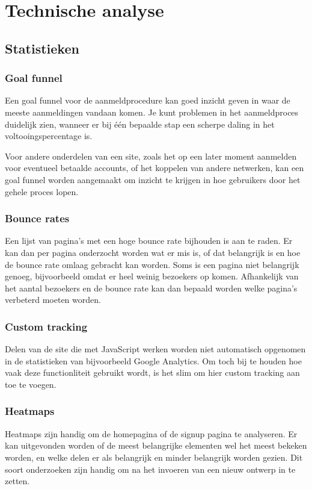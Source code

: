 \documentclass[a4paper, 10pt, pdftex]{report}
\begin{document}
  \section{Technische analyse}
    \subsection{Statistieken}
      \subsubsection{Goal funnel}
        Een goal funnel voor de aanmeldprocedure kan goed inzicht geven in waar de meeste aanmeldingen vandaan komen. Je kunt problemen in het aanmeldproces duidelijk zien, wanneer er bij \'e\'en bepaalde stap een scherpe daling in het voltooingspercentage is.

        Voor andere onderdelen van een site, zoals het op een later moment aanmelden voor eventueel betaalde accounts, of het koppelen van andere netwerken, kan een goal funnel worden aangemaakt om inzicht te krijgen in hoe gebruikers door het gehele proces lopen.

      \subsubsection{Bounce rates}
        Een lijst van pagina's met een hoge bounce rate bijhouden is aan te raden. Er kan dan per pagina onderzocht worden wat er mis is, of dat belangrijk is en hoe de bounce rate omlaag gebracht kan worden. Soms is een pagina niet belangrijk genoeg, bijvoorbeeld omdat er heel weinig bezoekers op komen. Afhankelijk van het aantal bezoekers en de bounce rate kan dan bepaald worden welke pagina's verbeterd moeten worden.

      \subsubsection{Custom tracking}
        Delen van de site die met JavaScript werken worden niet automatisch opgenomen in de statistieken van bijvoorbeeld Google Analytics. Om toch bij te houden hoe vaak deze functionliteit gebruikt wordt, is het slim om hier custom tracking aan toe te voegen.

      \subsubsection{Heatmaps}
        Heatmaps zijn handig om de homepagina of de signup pagina te analyseren. Er kan uitgevonden worden of de meest belangrijke elementen wel het meest bekeken worden, en welke delen er als belangrijk en minder belangrijk worden gezien. Dit soort onderzoeken zijn handig om na het invoeren van een nieuw ontwerp in te zetten.
\end{document}
